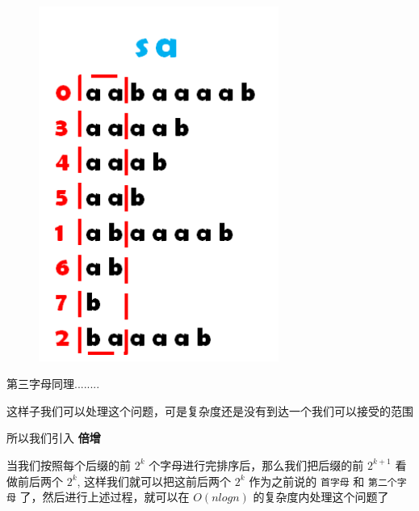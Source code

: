 \begin{figure}[htbp]
\centering
\includegraphics[width=0.7\textwidth]{docs/string/images/sa3.png} 

\end{figure}

第三字母同理........

这样子我们可以处理这个问题，可是复杂度还是没有到达一个我们可以接受的范围

所以我们引入 \textbf{ 倍增 }

当我们按照每个后缀的前 $2^k$ 个字母进行完排序后，那么我们把后缀的前 $2^{k+1}$ 看做前后两个 $2^k$, 这样我们就可以把这前后两个 $2^k$ 作为之前说的 \texttt{首字母} 和 \texttt{第二个字母} 了，然后进行上述过程，就可以在 $O(nlogn)$ 的复杂度内处理这个问题了

